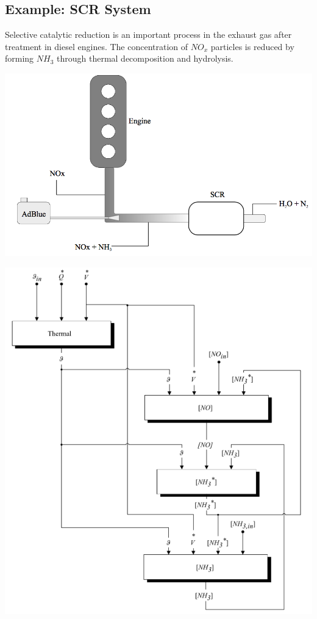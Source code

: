 \documentclass[10pt,a4paper]{scrartcl}
\begin{document}
\begin{multicols*}{3}
\subsection{Example: SCR System}
Selective catalytic reduction is an important process in the exhaust gas after treatment in diesel engines. The concentration of $NO_x$ particles is reduced by forming $NH_3$ through thermal decomposition and hydrolysis. \\
\begin{minipage}{0.4\columnwidth}
		\begin{center}\includegraphics[width=\columnwidth]{scr_1.png}\end{center}
           \end{minipage} 
 \begin{minipage}{0.6\columnwidth}
		\begin{center}\includegraphics[width=0.8\columnwidth]{scr_2.png}\end{center}

\end{minipage}
\end{multicols*}
\end{document}
